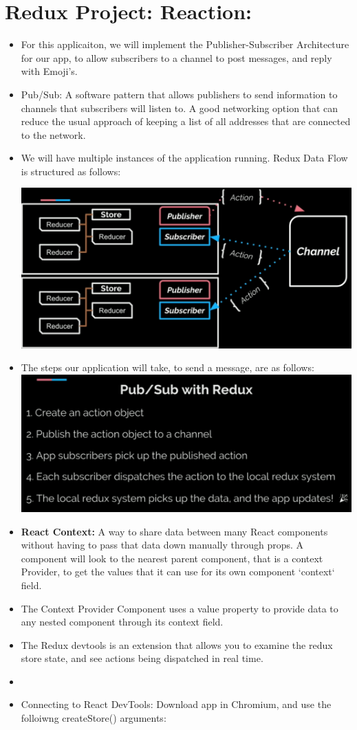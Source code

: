 \documentclass[8pt,a4paper]{extarticle}
\begin{document}
\section*{Redux Project: Reaction:}
\begin{itemize}
\item For this applicaiton, we will implement the Publisher-Subscriber Architecture for our app, to allow subscribers to a channel to post messages, and reply with Emoji's.
\item Pub/Sub: A software pattern that allows publishers to send information to channels that subscribers will listen to. A good networking option that can reduce the usual approach of keeping a list of all addresses that are connected to the network.
\item We will have multiple instances of the application running. Redux Data Flow is structured as follows:

\includegraphics[scale=0.20]{pubsub.png}

\item The steps our application will take, to send a message, are as follows:
\includegraphics[scale=0.20]{pubsublist.png}

\item \textbf{React Context:} A way to share data between many React components without having to pass that data down manually through props. A component will look to the nearest parent component, that is a context Provider, to get the values that it can use for its own component `context` field.
\item The Context Provider Component uses a value property to provide data to any nested component through its context field.
\item The Redux devtools is an extension that allows you to examine the redux store state, and see actions being dispatched in real time.
\item
\item Connecting to React DevTools: Download app in Chromium, and use the folloiwng createStore() arguments:


\end{itemize}
\end{document}
